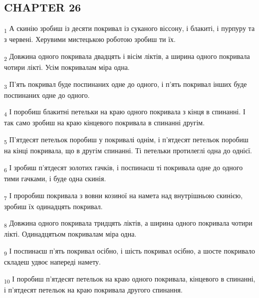 \subsection{CHAPTER 26}
\begin{tcolorbox}
\textsubscript{1} А скинію зробиш із десяти покривал із суканого віссону, і блакиті, і пурпуру та з червені. Херувими мистецькою роботою зробиш ти їх.
\end{tcolorbox}
\begin{tcolorbox}
\textsubscript{2} Довжина одного покривала двадцять і вісім ліктів, а ширина одного покривала чотири лікті. Усім покривалам міра одна.
\end{tcolorbox}
\begin{tcolorbox}
\textsubscript{3} П'ять покривал буде поспинаних одне до одного, і п'ять покривал інших буде поспинаних одне до одного.
\end{tcolorbox}
\begin{tcolorbox}
\textsubscript{4} І поробиш блакитні петельки на краю одного покривала з кінця в спинанні. І так само зробиш на краю кінцевого покривала в спинанні другім.
\end{tcolorbox}
\begin{tcolorbox}
\textsubscript{5} П'ятдесят петельок поробиш у покривалі однім, і п'ятдесят петельок поробиш на кінці покривала, що в другім спинанні. Ті петельки протилеглі одна до однієї.
\end{tcolorbox}
\begin{tcolorbox}
\textsubscript{6} І зробиш п'ятдесят золотих гачків, і поспинаєш ті покривала одне до одного тими гачками, і буде одна скинія.
\end{tcolorbox}
\begin{tcolorbox}
\textsubscript{7} І проробиш покривала з вовни козиної на намета над внутрішньою скинією, зробиш їх одинадцять покривал.
\end{tcolorbox}
\begin{tcolorbox}
\textsubscript{8} Довжина одного покривала тридцять ліктів, а ширина одного покривала чотири лікті. Одинадцятьом покривалам міра одна.
\end{tcolorbox}
\begin{tcolorbox}
\textsubscript{9} І поспинаєш п'ять покривал осібно, і шість покривал осібно, а шосте покривало складеш удвоє напереді намету.
\end{tcolorbox}
\begin{tcolorbox}
\textsubscript{10} І поробиш п'ятдесят петельок на краю одного покривала, кінцевого в спинанні, і п'ятдесят петельок на краю покривала другого спинання.
\end{tcolorbox}
